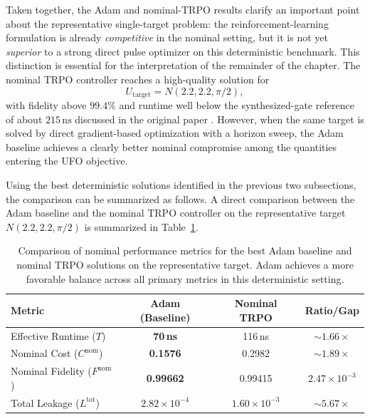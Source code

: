 Taken together, the Adam and nominal-TRPO results clarify an important point about the representative single-target problem: the reinforcement-learning formulation is already \emph{competitive} in the nominal setting, but it is not yet \emph{superior} to a strong direct pulse optimizer on this deterministic benchmark. This distinction is essential for the interpretation of the remainder of the chapter. The nominal TRPO controller reaches a high-quality solution for
\begin{equation}
U_{\mathrm{target}} = N(2.2,2.2,\pi/2),
\label{eq:comparative_target_gate}
\end{equation}
with fidelity above \(99.4\%\) and runtime well below the synthesized-gate reference of about \(215\,\mathrm{ns}\) discussed in the original paper \cite{Niu2019}. However, when the same target is solved by direct gradient-based optimization with a horizon sweep, the Adam baseline achieves a clearly better nominal compromise among the quantities entering the UFO objective.

Using the best deterministic solutions identified in the previous two subsections, the comparison can be summarized as follows.
A direct comparison between the Adam baseline and the nominal TRPO controller on the representative target $N(2.2,2.2,\pi/2)$ is summarized in Table~\ref{tab:single_target_nominal_comparison}.

\begin{table}[ht]
\centering
\begin{tabular}{lccc}
\hline
Metric & Adam (Baseline) & Nominal TRPO & Ratio/Gap \\
\hline
Effective Runtime (\(T\)) & \textbf{70\,ns} & 116\,ns & $\sim 1.66\times$ \\
Nominal Cost (\(C^{\mathrm{nom}}\)) & \textbf{0.1576} & 0.2982 & $\sim 1.89\times$ \\
Nominal Fidelity (\(F^{\mathrm{nom}}\)) & \textbf{0.99662} & 0.99415 & $2.47\times 10^{-3}$ \\
Total Leakage (\(L^{\mathrm{tot}}\)) & \textbf{\(2.82\times 10^{-4}\)} & \(1.60\times 10^{-3}\) & $\sim 5.67\times$ \\
\hline
\end{tabular}
\caption{Comparison of nominal performance metrics for the best Adam baseline and nominal TRPO solutions on the representative target. Adam achieves a more favorable balance across all primary metrics in this deterministic setting.}
\label{tab:single_target_nominal_comparison}
\end{table}

